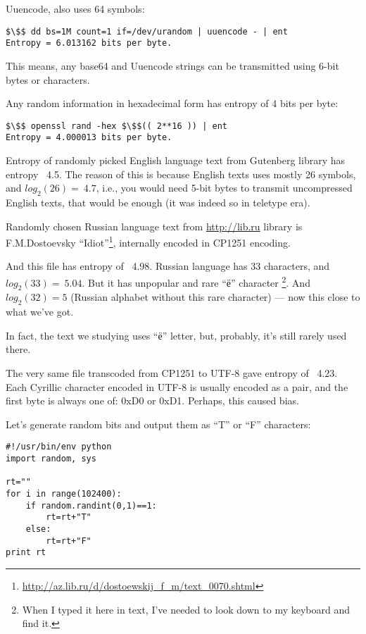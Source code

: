 Uuencode, also uses 64 symbols:

\begin{lstlisting}[basicstyle=\ttfamily, mathescape]
$\$$ dd bs=1M count=1 if=/dev/urandom | uuencode - | ent
Entropy = 6.013162 bits per byte.
\end{lstlisting}

This means, any base64 and Uuencode strings can be transmitted using 6-bit bytes or characters.

Any random information in hexadecimal form has entropy of 4 bits per byte:

\begin{lstlisting}[basicstyle=\ttfamily, mathescape]
$\$$ openssl rand -hex $\$$(( 2**16 )) | ent
Entropy = 4.000013 bits per byte.
\end{lstlisting}

Entropy of randomly picked English language text from Gutenberg library has entropy ~4.5.
The reason of this is because English texts uses mostly 26 symbols, and $log_2(26)=~4.7$, i.e., you would need
5-bit bytes to transmit uncompressed English texts, that would be enough (it was indeed so in teletype era).

Randomly chosen Russian language text from \url{http://lib.ru}
library is F.M.Dostoevsky ``Idiot''\footnote{\url{http://az.lib.ru/d/dostoewskij_f_m/text_0070.shtml}},
internally encoded in CP1251 encoding.

And this file has entropy of ~4.98.
Russian language has 33 characters, and $log_2(33)=~5.04$.
But it has unpopular and rare ``ё'' character
\footnote{When I typed it here in text, I've needed to look down to my keyboard and find it.}.
And $log_2(32)=5$ (Russian alphabet without this rare character) --- now this close to what we've got.

In fact, the text we studying uses ``ё'' letter, but, probably, it's still rarely used there.

The very same file transcoded from CP1251 to UTF-8 gave entropy of ~4.23.
Each Cyrillic character encoded in UTF-8 is usually encoded as a pair,
and the first byte is always one of: 0xD0 or 0xD1.
Perhaps, this caused bias.

Let's generate random bits and output them as ``T'' or ``F'' characters:

\begin{lstlisting}
#!/usr/bin/env python
import random, sys

rt=""
for i in range(102400):
    if random.randint(0,1)==1:
        rt=rt+"T"
    else:
        rt=rt+"F"
print rt
\end{lstlisting}

